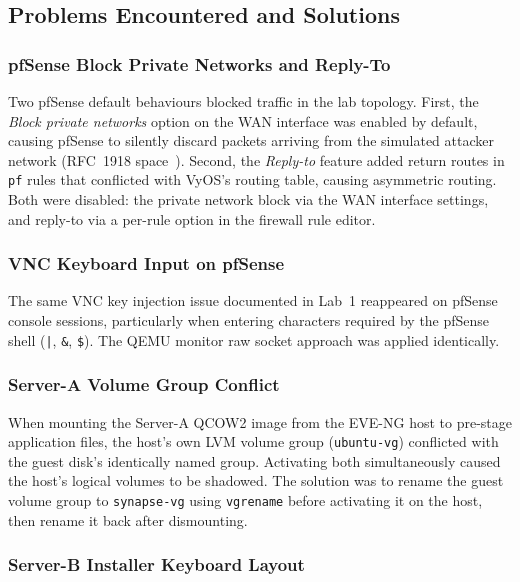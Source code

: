 \newpage

\subsection{Problems Encountered and Solutions}

\subsubsection{pfSense Block Private Networks and Reply-To}

Two pfSense default behaviours blocked traffic in the lab topology. First, the
\textit{Block private networks} option on the WAN interface was enabled by default,
causing pfSense to silently discard packets arriving from the simulated
attacker network (RFC~1918 space~\cite{rfc1918}). Second, the \textit{Reply-to}
feature added return routes in \texttt{pf} rules that conflicted with VyOS's
routing table, causing asymmetric routing. Both were disabled: the private network
block via the WAN interface settings, and reply-to via a per-rule option in the
firewall rule editor.

\subsubsection{VNC Keyboard Input on pfSense}

The same VNC key injection issue documented in Lab~1 reappeared on pfSense
console sessions, particularly when entering characters required by the pfSense
shell (\texttt{|}, \texttt{\&}, \texttt{\$}). The QEMU monitor raw socket approach
was applied identically.

\subsubsection{Server-A Volume Group Conflict}

When mounting the Server-A QCOW2 image from the EVE-NG host to pre-stage
application files, the host's own LVM volume group (\texttt{ubuntu-vg}) conflicted
with the guest disk's identically named group. Activating both simultaneously
caused the host's logical volumes to be shadowed. The solution was to rename the
guest volume group to \texttt{synapse-vg} using \texttt{vgrename} before activating
it on the host, then rename it back after dismounting.

\subsubsection{Server-B Installer Keyboard Layout}

